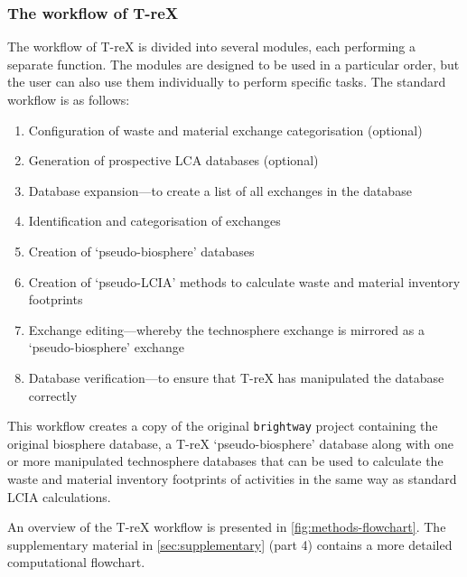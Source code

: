 \documentclass[a4paper,fleqn]{cas-dc}
\renewcommand{\texttt}[1]{{\ttfamily\small\nolinkurl{#1}}}
\begin{document}
\subsubsection{The workflow of T-reX}

The workflow of T-reX is divided into several modules, each performing a
separate function. The modules are designed to be used in a particular order,
but the user can also use them individually to perform specific tasks. The
standard workflow is as follows:

\begin{enumerate}
	\item Configuration of waste and material exchange categorisation (optional)
	\item Generation of prospective LCA databases (optional)
	\item Database expansion---to create a list of all exchanges in the database
	\item Identification and categorisation of exchanges
	\item Creation of `pseudo-biosphere' databases
	\item Creation of `pseudo-LCIA' methods to calculate waste and material inventory
	      footprints
	\item Exchange editing---whereby the technosphere exchange is mirrored as a
	      `pseudo-biosphere' exchange
	\item Database verification---to ensure that T-reX has manipulated the database
	      correctly
\end{enumerate}

This workflow creates a copy of the original \texttt{brightway} project
containing the original biosphere database, a T-reX `pseudo-biosphere' database
along with one or more manipulated technosphere databases that can be used to
calculate the waste and material inventory footprints of activities in the same
way as standard LCIA calculations.

An overview of the T-reX workflow is presented in
\autoref{fig:methods-flowchart}. The supplementary material in
\autoref{sec:supplementary} (part 4) contains a more detailed computational flowchart.
\end{document}
